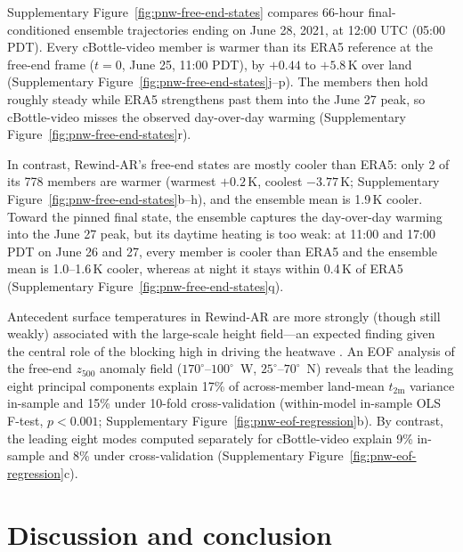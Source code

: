 \documentclass{article}
\begin{document}
Supplementary Figure~\ref{fig:pnw-free-end-states} compares 66-hour final-conditioned ensemble trajectories ending on June 28, 2021, at 12:00 UTC (05:00 PDT). Every cBottle-video member is warmer than its ERA5 reference at the free-end frame ($t=0$, June 25, 11:00 PDT), by $+0.44$ to $+5.8$\,K over land (Supplementary Figure~\ref{fig:pnw-free-end-states}j--p). The members then hold roughly steady while ERA5 strengthens past them into the June 27 peak, so cBottle-video misses the observed day-over-day warming (Supplementary Figure~\ref{fig:pnw-free-end-states}r).

In contrast, Rewind-AR's free-end states are mostly cooler than ERA5: only 2 of its 778 members are warmer (warmest $+0.2$\,K, coolest $-3.77$\,K; Supplementary Figure~\ref{fig:pnw-free-end-states}b--h), and the ensemble mean is 1.9\,K cooler. Toward the pinned final state, the ensemble captures the day-over-day warming into the June 27 peak, but its daytime heating is too weak: at 11:00 and 17:00 PDT on June 26 and 27, every member is cooler than ERA5 and the ensemble mean is 1.0--1.6\,K cooler, whereas at night it stays within 0.4\,K of ERA5 (Supplementary Figure~\ref{fig:pnw-free-end-states}q).

Antecedent surface temperatures in Rewind-AR are more strongly (though still weakly) associated with the large-scale height field---an expected finding given the central role of the blocking high in driving the heatwave \citep{Schumacher2022-gb}. An EOF analysis of the free-end $z_{500}$ anomaly field ($170^\circ$--$100^\circ$~W, $25^\circ$--$70^\circ$~N) reveals that the leading eight principal components explain 17\% of across-member land-mean $t_{2\text{m}}$ variance in-sample and 15\% under 10-fold cross-validation (within-model in-sample OLS F-test, $p < 0.001$; Supplementary Figure~\ref{fig:pnw-eof-regression}b). By contrast, the leading eight modes computed separately for cBottle-video explain 9\% in-sample and 8\% under cross-validation (Supplementary Figure~\ref{fig:pnw-eof-regression}c).

\section{Discussion and conclusion}
\end{document}
